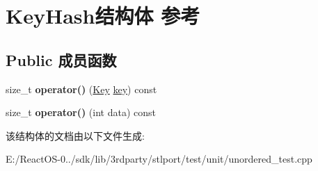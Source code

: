 \hypertarget{struct_key_hash}{}\section{Key\+Hash结构体 参考}
\label{struct_key_hash}
\subsection*{Public 成员函数}
\begin{DoxyCompactItemize}
\item 
\mbox{\label{struct_key_hash_a5b6a7336875ed8f9e9c975d06ab03e25}} 
size\+\_\+t {\bfseries operator()} (\hyperlink{struct_key}{Key} \hyperlink{structkey}{key}) const
\item 
\mbox{\label{struct_key_hash_a1698e8fa607319d7c36293c39a3752c0}} 
size\+\_\+t {\bfseries operator()} (int data) const
\end{DoxyCompactItemize}


该结构体的文档由以下文件生成\+:\begin{DoxyCompactItemize}
\item 
E\+:/\+React\+O\+S-\/0../sdk/lib/3rdparty/stlport/test/unit/unordered\+\_\+test.\+cpp\end{DoxyCompactItemize}
